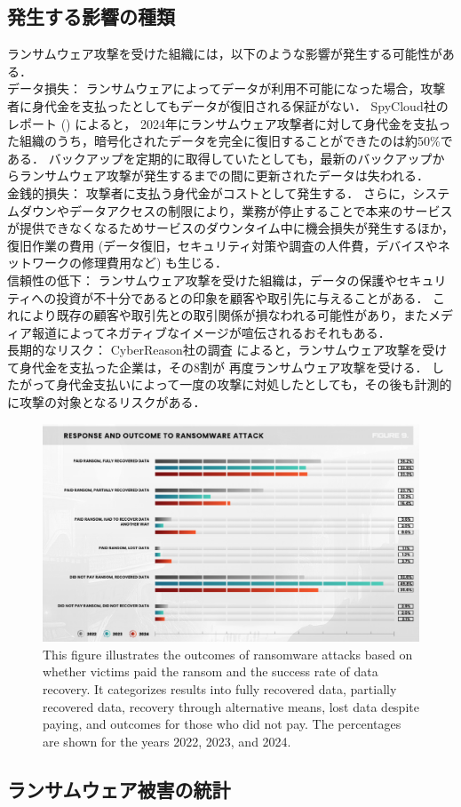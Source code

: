 \subsection{発生する影響の種類}
ランサムウェア攻撃を受けた組織には，以下のような影響が発生する可能性がある．
\\
データ損失：
ランサムウェアによってデータが利用不可能になった場合，攻撃者に身代金を支払ったとしてもデータが復旧される保証がない．
SpyCloud社のレポート \cite{spycloud-ransomware} () によると，
2024年にランサムウェア攻撃者に対して身代金を支払った組織のうち，暗号化されたデータを完全に復旧することができたのは約50\%である．
バックアップを定期的に取得していたとしても，最新のバックアップからランサムウェア攻撃が発生するまでの間に更新されたデータは失われる\cite{wang2024ransom}．
\\
金銭的損失：
攻撃者に支払う身代金がコストとして発生する．
さらに，システムダウンやデータアクセスの制限により，業務が停止することで本来のサービスが提供できなくなるためサービスのダウンタイム中に機会損失が発生するほか，
復旧作業の費用 (データ復旧，セキュリティ対策や調査の人件費，デバイスやネットワークの修理費用など) も生じる．
\\
信頼性の低下：
ランサムウェア攻撃を受けた組織は，データの保護やセキュリティへの投資が不十分であるとの印象を顧客や取引先に与えることがある．
これにより既存の顧客や取引先との取引関係が損なわれる可能性があり，またメディア報道によってネガティブなイメージが喧伝されるおそれもある．
\\
長期的なリスク：
CyberReason社の調査 \cite{cyberreason-report}によると，ランサムウェア攻撃を受けて身代金を支払った企業は，その8割が
再度ランサムウェア攻撃を受ける．
したがって身代金支払いによって一度の攻撃に対処したとしても，その後も計測的に攻撃の対象となるリスクがある．
\begin{figure}[t]
  \begin{center}
    \includegraphics[width=\columnwidth]{doc/img/pay-ransom-back-data.eps}
  \end{center}
  \caption{
    This figure illustrates the outcomes of ransomware attacks based on whether victims paid the ransom and the success rate of data recovery.
    It categorizes results into fully recovered data, partially recovered data, recovery through alternative means, lost data despite paying, and outcomes for those who did not pay.
    The percentages are shown for the years 2022, 2023, and 2024. \cite{spycloud-ransomware}}
  \label{fig:pay-ransom-back-data}
\end{figure}

\subsection{ランサムウェア被害の統計}
